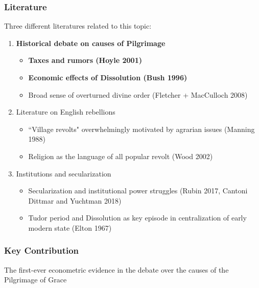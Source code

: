 \documentclass{beamer}
\begin{document}
    \begin{frame}
        \frametitle{Literature}
        Three different literatures related to this topic:
        \begin{enumerate}
            \item \textbf{Historical debate on causes of Pilgrimage}
            \begin{itemize}
                \item \textbf{Taxes and rumors (Hoyle 2001)}
                \item \textbf{Economic effects of Dissolution (Bush 1996)}
                \item Broad sense of overturned divine order (Fletcher + MacCulloch 2008)
            \end{itemize}

            \item Literature on English rebellions
            \begin{itemize}
                \item ``Village revolts" overwhelmingly motivated by agrarian issues (Manning 1988)
                \item Religion as the language of all popular revolt (Wood 2002)
            \end{itemize}
            
            \item Institutions and secularization
            \begin{itemize}
                \item Secularization and institutional power struggles (Rubin 2017, Cantoni Dittmar and Yuchtman 2018)
                \item Tudor period and Dissolution as key episode in centralization of early modern state (Elton 1967) 
            \end{itemize}
        \end{enumerate}
    \end{frame}

    \begin{frame}
        \frametitle{Key Contribution}
        \Large
        \centering
        The first-ever econometric evidence in the debate over the causes of the Pilgrimage of Grace
    \end{frame}
\end{document}
